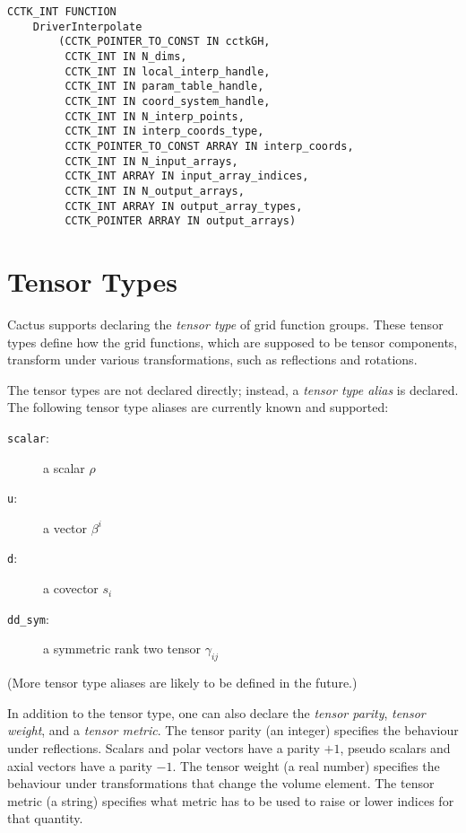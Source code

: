 \begin{verbatim}
CCTK_INT FUNCTION
    DriverInterpolate
        (CCTK_POINTER_TO_CONST IN cctkGH,
         CCTK_INT IN N_dims,
         CCTK_INT IN local_interp_handle,
         CCTK_INT IN param_table_handle,
         CCTK_INT IN coord_system_handle,
         CCTK_INT IN N_interp_points,
         CCTK_INT IN interp_coords_type,
         CCTK_POINTER_TO_CONST ARRAY IN interp_coords,
         CCTK_INT IN N_input_arrays,
         CCTK_INT ARRAY IN input_array_indices,
         CCTK_INT IN N_output_arrays,
         CCTK_INT ARRAY IN output_array_types,
         CCTK_POINTER ARRAY IN output_arrays)
\end{verbatim}


\section{Tensor Types}

Cactus supports declaring the \emph{tensor type} of grid function
groups.  These tensor types define how the grid functions, which are
supposed to be tensor components, transform under various
transformations, such as reflections and rotations.

The tensor types are not declared directly; instead, a \emph{tensor
type alias} is declared.  The following tensor type aliases are
currently known and supported:
\begin{description}
\item[\texttt{scalar}:] a scalar $\rho$
\item[\texttt{u}:] a vector $\beta^i$
\item[\texttt{d}:] a covector $s_i$
\item[\texttt{dd\_sym}:] a symmetric rank two tensor $\gamma_{ij}$
\end{description}
(More tensor type aliases are likely to be defined in the future.)

In addition to the tensor type, one can also declare the \emph{tensor
  parity}, \emph{tensor weight}, and a \emph{tensor metric}.  The
tensor parity (an integer) specifies the behaviour under reflections.
Scalars and polar vectors have a parity $+1$, pseudo scalars and axial
vectors have a parity $-1$.  The tensor weight (a real number)
specifies the behaviour under transformations that change the volume
element.  The tensor metric (a string) specifies what metric has to be
used to raise or lower indices for that quantity.

